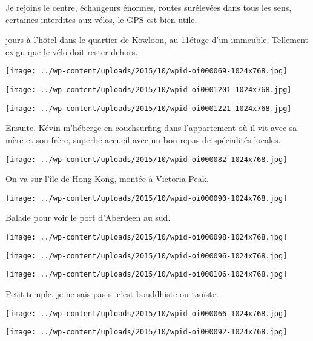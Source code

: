  Je rejoins le centre, échangeurs énormes, routes surélevées dans tous les sens, certaines interdites aux vélos, le GPS est bien utile.

 jours à l'hôtel dans le quartier de Kowloon, au 11\ieme étage d'un immeuble. Tellement exigu que le vélo doit rester dehors. 
\begin{center} \texttt{[image: ../wp-content/uploads/2015/10/wpid-oi000069-1024x768.jpg]} \end{center}
\begin{center} \texttt{[image: ../wp-content/uploads/2015/10/wpid-oi0001201-1024x768.jpg]} \end{center}
\begin{center} \texttt{[image: ../wp-content/uploads/2015/10/wpid-oi0001221-1024x768.jpg]} \end{center}

 Ensuite, Kévin m'héberge en couchsurfing dans l'appartement où il vit avec sa mère et son frère, superbe accueil avec un bon repas de spécialités locales. 
\begin{center} \texttt{[image: ../wp-content/uploads/2015/10/wpid-oi000082-1024x768.jpg]} \end{center}

\pagebreak
 On va sur l'île de Hong Kong, montée à Victoria Peak. 
\begin{center} \texttt{[image: ../wp-content/uploads/2015/10/wpid-oi000090-1024x768.jpg]} \end{center}

 Balade pour voir le port d'Aberdeen au sud. 
\begin{center} \texttt{[image: ../wp-content/uploads/2015/10/wpid-oi000098-1024x768.jpg]} \end{center}
\begin{center} \texttt{[image: ../wp-content/uploads/2015/10/wpid-oi000096-1024x768.jpg]} \end{center}
\begin{center} \texttt{[image: ../wp-content/uploads/2015/10/wpid-oi000106-1024x768.jpg]} \end{center}

\pagebreak
 Petit temple, je ne sais pas si c'est bouddhiste ou taoïste. 
\begin{center} \texttt{[image: ../wp-content/uploads/2015/10/wpid-oi000066-1024x768.jpg]} \end{center}
\begin{center} \texttt{[image: ../wp-content/uploads/2015/10/wpid-oi000092-1024x768.jpg]} \end{center}


